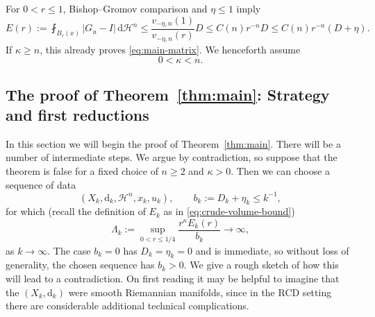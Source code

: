 \documentclass[12pt,a4paper,reqno]{amsart}
\renewcommand{\leq}{\leqslant}
\renewcommand{\geq}{\geqslant}
\newcommand{\Hn}{\mathcal H^n}
\begin{document}
For $0<r\leq1$, Bishop--Gromov comparison and $\eta\leq1$
imply
\begin{equation}\label{eq:crude-volume-bound}
 E(r):=\fint_{B_r(x)}|G_u-I|\,\mathrm{d}\Hn
 \leq
 \frac{v_{-\eta,n}(1)}{v_{-\eta,n}(r)}D
 \leq C(n)r^{-n}D
 \leq C(n)r^{-n}(D+\eta).
\end{equation}
If $\kappa\geq n$, this already proves
\eqref{eq:main-matrix}.  We henceforth assume 
\begin{equation}\label{eqn:0-kappa-n}
    0<\kappa<n.
\end{equation}


\subsection{The proof of Theorem~\ref{thm:main}: Strategy and first reductions}
In this section we will begin the proof of Theorem~\ref{thm:main}. There will be a number of intermediate steps. We argue by contradiction, so suppose that the theorem is false for a fixed choice of $n\geq 2$ and $\kappa>0$.  Then we can choose a sequence of data
\begin{equation}\label{eqn:TheSequence}
 (X_k,\mathrm{d}_k,\Hn,x_k,u_k),\qquad
 b_k:=D_k+\eta_k\leq k^{-1},
\end{equation}
for which (recall the definition of $E_k$ as in \eqref{eq:crude-volume-bound})
\[
 \Lambda_k:=
 \sup_{0<r\leq 1/4}\frac{r^\kappa E_k(r)}{b_k}
 \to\infty,
\]
as $k\to\infty$. 
The case $b_k=0$ has $D_k=\eta_k=0$ and is immediate, so without loss of generality, the chosen
sequence has $b_k>0$. We give a rough sketch of how this will lead to a contradiction. On first reading it may be helpful to imagine that the $(X_k, \mathrm{d}_k)$ were smooth Riemannian manifolds, since in the RCD setting there are considerable additional technical complications. 
\end{document}
